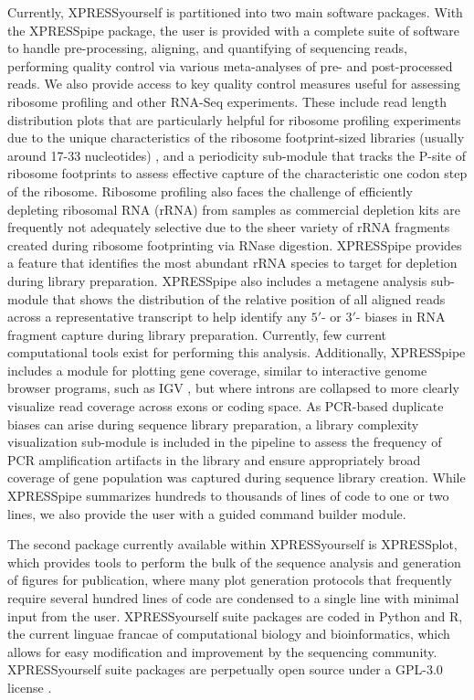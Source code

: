 \documentclass[10pt, oneside]{article}
\begin{document}
Currently, XPRESSyourself is partitioned into two main software packages. With the XPRESSpipe package, the user is provided with a complete suite of software to handle pre-processing, aligning, and quantifying of sequencing reads, performing quality control via various meta-analyses of pre- and post-processed reads. We also provide access to key quality control measures useful for assessing ribosome profiling and other RNA-Seq experiments. These include read length distribution plots that are particularly helpful for ribosome profiling experiments due to the unique characteristics of the ribosome footprint-sized libraries (usually around 17-33 nucleotides) \cite{fp_range}, and a periodicity sub-module that tracks the P-site of ribosome footprints to assess effective capture of the characteristic one codon step of the ribosome. Ribosome profiling also faces the challenge of efficiently depleting ribosomal RNA (rRNA) from samples as commercial depletion kits are frequently not adequately selective due to the sheer variety of rRNA fragments created during ribosome footprinting via RNase digestion. XPRESSpipe provides a feature that identifies the most abundant rRNA species to target for depletion during library preparation. XPRESSpipe also includes a metagene analysis sub-module that shows the distribution of the relative position of all aligned reads across a representative transcript to help identify any $5'$- or $3'$- biases in RNA fragment capture during library preparation. Currently, few current computational tools exist for performing this analysis. Additionally, XPRESSpipe includes a module for plotting gene coverage, similar to interactive genome browser programs, such as IGV \cite{igv}, but where introns are collapsed to more clearly visualize read coverage across exons or coding space. As PCR-based duplicate biases can arise during sequence library preparation, a library complexity visualization sub-module is included in the pipeline to assess the frequency of PCR amplification artifacts in the library and ensure appropriately broad coverage of gene population was captured during sequence library creation. While XPRESSpipe summarizes hundreds to thousands of lines of code to one or two lines, we also provide the user with a guided command builder module. \par

The second package currently available within XPRESSyourself is XPRESSplot, which provides tools to perform the bulk of the sequence analysis and generation of figures for publication, where many plot generation protocols that frequently require several hundred lines of code are condensed to a single line with minimal input from the user. XPRESSyourself suite packages are coded in Python and R, the current linguae francae of computational biology and bioinformatics, which allows for easy modification and improvement by the sequencing community. XPRESSyourself suite packages are perpetually open source under a GPL-3.0 license \cite{xpressyourself}. \par
\end{document}
